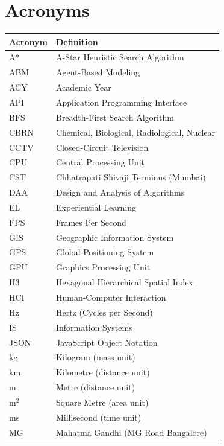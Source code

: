 \documentclass[12pt,a4paper,oneside]{report}
\begin{document}
\section*{Acronyms}
\vspace{0.3cm}
\begin{table}[H]
\centering
\small
\begin{tabular}{|l|l|}
\hline
\textbf{Acronym} & \textbf{Definition} \\
\hline
A* & A-Star Heuristic Search Algorithm \\
\hline
ABM & Agent-Based Modeling \\
\hline
ACY & Academic Year \\
\hline
API & Application Programming Interface \\
\hline
BFS & Breadth-First Search Algorithm \\
\hline
CBRN & Chemical, Biological, Radiological, Nuclear \\
\hline
CCTV & Closed-Circuit Television \\
\hline
CPU & Central Processing Unit \\
\hline
CST & Chhatrapati Shivaji Terminus (Mumbai) \\
\hline
DAA & Design and Analysis of Algorithms \\
\hline
EL & Experiential Learning \\
\hline
FPS & Frames Per Second \\
\hline
GIS & Geographic Information System \\
\hline
GPS & Global Positioning System \\
\hline
GPU & Graphics Processing Unit \\
\hline
H3 & Hexagonal Hierarchical Spatial Index \\
\hline
HCI & Human-Computer Interaction \\
\hline
Hz & Hertz (Cycles per Second) \\
\hline
IS & Information Systems \\
\hline
JSON & JavaScript Object Notation \\
\hline
kg & Kilogram (mass unit) \\
\hline
km & Kilometre (distance unit) \\
\hline
m & Metre (distance unit) \\
\hline
m$^2$ & Square Metre (area unit) \\
\hline
ms & Millisecond (time unit) \\
\hline
MG & Mahatma Gandhi (MG Road Bangalore) \\

\end{tabular}
\end{table}
\end{document}
